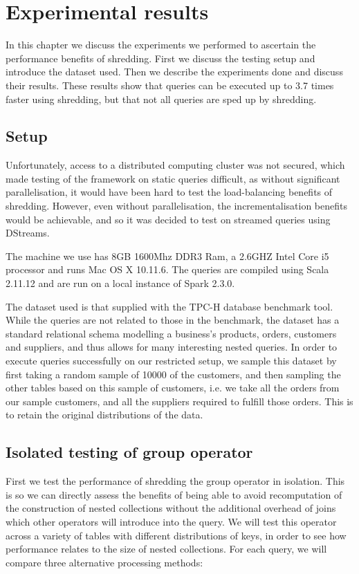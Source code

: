 \chapter{Experimental results} \label{results}

In this chapter we discuss the experiments we performed to ascertain the performance benefits of shredding. First we discuss the testing setup and introduce the dataset used. Then we describe the experiments done and discuss their results. These results show that queries can be executed up to 3.7 times faster using shredding, but that not all queries are sped up by shredding.

\section{Setup}

Unfortunately, access to a distributed computing cluster was not secured, which made testing of the framework on static queries difficult, as without significant parallelisation, it would have been hard to test the load-balancing benefits of shredding. However, even without parallelisation, the incrementalisation benefits would be achievable, and so it was decided to test on streamed queries using DStreams.

The machine we use has 8GB 1600Mhz DDR3 Ram, a 2.6GHZ Intel Core i5 processor and runs Mac OS X 10.11.6. The queries are compiled using Scala 2.11.12 and are run on a local instance of Spark 2.3.0. 

The dataset used is that supplied with the TPC-H \cite{tpch} database benchmark tool. While the queries are not related to those in the benchmark, the dataset has a standard relational schema modelling a business's products, orders, customers and suppliers, and thus allows for many interesting nested queries. In order to execute queries successfully on our restricted setup, we sample this dataset by first taking a random sample of 10000 of the customers, and then sampling the other tables based on this sample of customers, i.e. we take all the orders from our sample customers, and all the suppliers required to fulfill those orders. This is to retain the original distributions of the data.

\section{Isolated testing of group operator}
First we test the performance of shredding the group operator in isolation. This is so we can directly assess the benefits of being able to avoid recomputation of the construction of nested collections without the additional overhead of joins which other operators will introduce into the query. We will test this operator across a variety of tables with different distributions of keys, in order to see how performance relates to the size of nested collections. For each query, we will compare three alternative processing methods:

